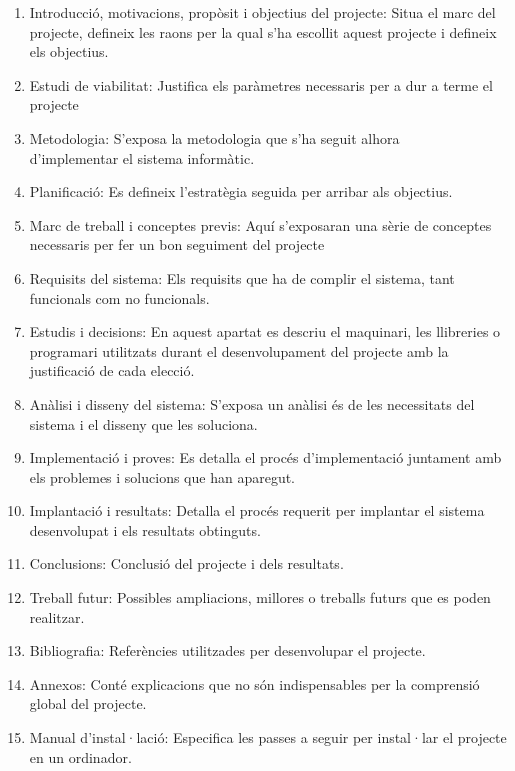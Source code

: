 \documentclass[12pt, titlepage]{article}
\begin{document}
\begin{enumerate}
\item Introducció, motivacions, propòsit i objectius del projecte: Situa el marc
del projecte, defineix les raons per la qual s'ha escollit aquest projecte i defineix
els objectius.

\item Estudi de viabilitat: Justifica els paràmetres necessaris per a dur
a terme el projecte

\item Metodologia: S’exposa la metodologia que s'ha seguit alhora \\
d'implementar el sistema informàtic.

\item Planificació: Es defineix l’estratègia seguida per arribar als objectius.

\item Marc de treball i conceptes previs: Aquí s'exposaran una sèrie de conceptes
necessaris per fer un bon seguiment del projecte

\item Requisits del sistema: Els requisits que ha de complir el
sistema, tant funcionals com no funcionals.

\item Estudis i decisions: En aquest apartat es descriu el maquinari, les
llibreries o programari utilitzats durant el desenvolupament del projecte amb la
justificació de cada elecció.

\item Anàlisi i disseny del sistema: S'exposa un anàlisi és de les necessitats del
sistema i el disseny que les soluciona.

\item Implementació i proves: Es detalla el procés d'implementació juntament amb
els problemes i solucions que han aparegut.

\item Implantació i resultats: Detalla el procés requerit per implantar el sistema
desenvolupat i els resultats obtinguts.

\item Conclusions: Conclusió del projecte i dels resultats.

\item Treball futur: Possibles ampliacions, millores o treballs futurs que es
poden realitzar.

\item Bibliografia: Referències utilitzades per desenvolupar el projecte.

\item Annexos: Conté explicacions que no són indispensables per la comprensió global
del projecte.

\item Manual d'instal·lació: Especifica les passes a seguir per instal·lar el
projecte en un ordinador.

\end{enumerate}
\end{document}
